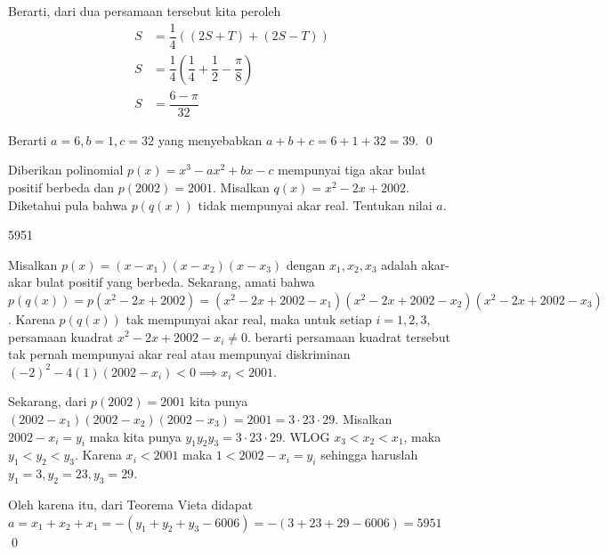 \documentclass[12pt]{scrartcl}
\begin{document}
\begin{soalbaru}
\begin{solusi}
			Berarti, dari dua persamaan tersebut kita peroleh
			\begin{equation*}
			\begin{split}
			S &= \dfrac{1}{4}\left((2S+T)+(2S-T)\right)\\
			S&= \dfrac{1}{4}\left(\dfrac{1}{4}+\dfrac{1}{2}-\dfrac{\pi}{8}\right)\\
			S&=\dfrac{6-\pi}{32}
			\end{split}
			\end{equation*}
			
			Berarti $a=6,b=1,c=32$ yang menyebabkan $a+b+c=6+1+32=39$. \qed
			\end{solusi}
		\end{soalbaru}
	
	\begin{soalbaru}
		Diberikan polinomial $p(x)=x^3-ax^2+bx-c$ mempunyai tiga akar bulat positif berbeda dan $p(2002)=2001$. Misalkan $q(x)=x^2-2x+2002$. Diketahui pula bahwa $p(q(x))$ tidak mempunyai akar real. Tentukan nilai $a$.
		
		\begin{jawaban}
		5951
		\end{jawaban}
		\begin{solusi}
					Misalkan $p(x)=(x-x_1)(x-x_2)(x-x_3)$ dengan $x_1,x_2,x_3$ adalah akar-akar bulat positif yang berbeda.  Sekarang, amati bahwa $p(q(x))=p(x^2-2x+2002)=(x^2-2x+2002-x_1)(x^2-2x+2002-x_2)(x^2-2x+2002-x_3)$. Karena $p(q(x))$ tak mempunyai akar real, maka  untuk setiap $i=1,2,3$, persamaan kuadrat $x^2-2x+2002-x_i \neq 0$. berarti persamaan kuadrat tersebut tak pernah mempunyai akar real atau mempunyai diskriminan $(-2)^2-4(1)(2002-x_i) < 0 \implies x_i < 2001$.
					
					Sekarang, dari $p(2002)=2001$ kita punya $(2002-x_1)(2002-x_2)(2002-x_3)=2001=3\cdot 23 \cdot 29$.  Misalkan $2002-x_i = y_i$ maka kita punya $y_1y_2y_3=3 \cdot 23 \cdot 29$. WLOG $x_3 < x_2 < x_1$, maka $y_1 < y_2<y_3$. Karena $x_i < 2001$ maka $1 < 2002 - x_i = y_i$ sehingga haruslah $y_1 = 3, y_2=23, y_3=29$.
					
					Oleh karena itu, dari Teorema Vieta didapat $a=x_1+x_2+x_1=-(y_1+y_2+y_3-6006)=-(3+23+29-6006)=5951$ \qed
		\end{solusi}
	\end{soalbaru}
	\newpage
\end{document}
